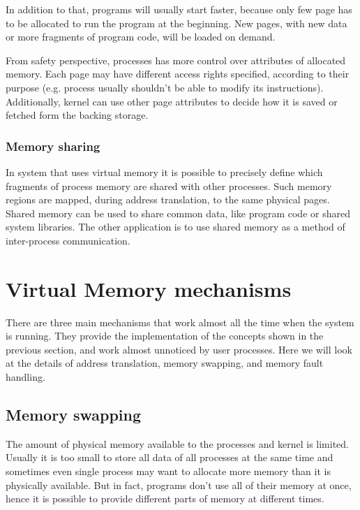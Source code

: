 In addition to that, programs will usually start faster, because only few page has to be allocated to run the program at the beginning.
New pages, with new data or more fragments of program code, will be loaded on demand.

From safety perspective, processes has more control over attributes of allocated memory.
Each page may have different access rights specified, according to their purpose (e.g. process usually shouldn't be able to modify its instructions).
Additionally, kernel can use other page attributes to decide how it is saved or fetched form the backing storage.

\subsubsection{Memory sharing}

In system that uses virtual memory it is possible to precisely define which fragments of process memory are shared with other processes.
Such memory regions are mapped, during address translation, to the same physical pages.
Shared memory can be used to share common data, like program code or shared system libraries.
The other application is to use shared memory as a method of inter-process communication.

\section{Virtual Memory mechanisms}

There are three main mechanisms that work almost all the time when the system is running.
They provide the implementation of the concepts shown in the previous section, and work almost unnoticed by user processes.
Here we will look at the details of address translation, memory swapping, and memory fault handling.

\subsection{Memory swapping}


The amount of physical memory available to the processes and kernel is limited.
Usually it is too small to store all data of all processes at the same time and sometimes even single process
may want to allocate more memory than it is physically available.
But in fact, programs don't use all of their memory at once, hence it is possible to provide different parts of memory at different times.

